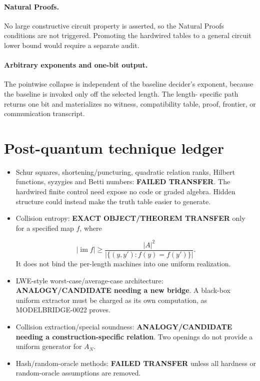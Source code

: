 \documentclass[11pt]{article}
\begin{document}
\paragraph{Natural Proofs.}
No large constructive circuit property is asserted, so the Natural Proofs
conditions are not triggered.  Promoting the hardwired tables to a general
circuit lower bound would require a separate audit.

\paragraph{Arbitrary exponents and one-bit output.}
The pointwise collapse is independent of the baseline decider's exponent,
because the baseline is invoked only off the selected length.  The length-
specific path returns one bit and materializes no witness, compatibility
table, proof, frontier, or communication transcript.

\section{Post-quantum technique ledger}

\begin{itemize}
\item Schur squares, shortening/puncturing, quadratic relation ranks, Hilbert
functions, syzygies and Betti numbers: \textbf{FAILED TRANSFER}.  The
hardwired finite control need expose no code or graded algebra.  Hidden
structure could instead make the truth table easier to generate.
\item Collision entropy: \textbf{EXACT OBJECT/THEOREM TRANSFER} only for a
specified map \(f\), where

\[
 |\operatorname{im}f|\ge
 \frac{|A|^2}{|\{(y,y'):f(y)=f(y')\}|}.
\]
It does not bind the per-length machines into one uniform realization.
\item LWE-style worst-case/average-case architecture:
\textbf{ANALOGY/CANDIDATE needing a new bridge}.  A black-box uniform
extractor must be charged as its own computation, as MODELBRIDGE-0022 proves.
\item Collision extraction/special soundness:
\textbf{ANALOGY/CANDIDATE needing a construction-specific relation}.
Two openings do not provide a uniform generator for \(A_N\).
\item Hash/random-oracle methods: \textbf{FAILED TRANSFER} unless all
hardness or random-oracle assumptions are removed.
\end{itemize}
\end{document}
